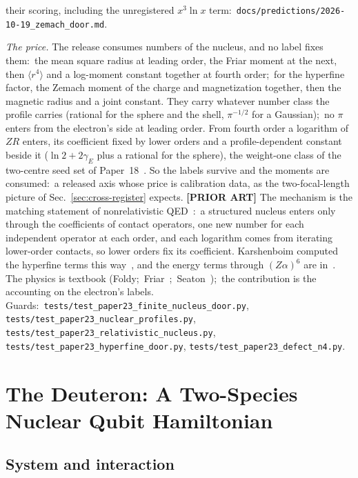 \documentclass[twocolumn,prc,amsmath,amssymb,superscriptaddress]{revtex4-2}
\begin{document}
their scoring, including the unregistered $x^3\ln x$ term:\ \texttt{docs/predictions/2026-10-19\_zemach\_door.md}.

\emph{The price.} The release consumes numbers of the nucleus, and no label fixes them:\ the mean square radius at leading order, the Friar moment at the next, then $\langle r^4\rangle$ and a log-moment constant together at fourth order;\ for the hyperfine factor, the Zemach moment of the charge and magnetization together, then the magnetic radius and a joint constant. They carry whatever number class the profile carries (rational for the sphere and the shell, $\pi^{-1/2}$ for a Gaussian);\ no $\pi$ enters from the electron's side at leading order. From fourth order a logarithm of $ZR$ enters, its coefficient fixed by lower orders and a profile-dependent constant beside it ($\ln 2 + 2\gamma_E$ plus a rational for the sphere), the weight-one class of the two-centre seed set of Paper~18~\cite{Paper18}. So the labels survive and the moments are consumed:\ a released axis whose price is calibration data, as the two-focal-length picture of Sec.~\ref{sec:cross-register} expects. \textbf{[PRIOR ART]} The mechanism is the matching statement of nonrelativistic QED~\cite{HillPaz2011}:\ a structured nucleus enters only through the coefficients of contact operators, one new number for each independent operator at each order, and each logarithm comes from iterating lower-order contacts, so lower orders fix its coefficient. Karshenboim computed the hyperfine terms this way~\cite{Karshenboim1997,Karshenboim2001}, and the energy terms through $(Z\alpha)^6$ are in~\cite{PPY2025}. The physics is textbook (Foldy;\ Friar~\cite{Friar1979};\ Seaton~\cite{Seaton1983});\ the contribution is the accounting on the electron's labels. Guards:\ \texttt{tests/test\_paper23\_finite\_nucleus\_door.py}, \texttt{tests/test\_paper23\_nuclear\_profiles.py}, \texttt{tests/test\_paper23\_relativistic\_nucleus.py}, \texttt{tests/test\_paper23\_hyperfine\_door.py}, \texttt{tests/test\_paper23\_defect\_n4.py}.

\section{The Deuteron: A Two-Species Nuclear Qubit Hamiltonian}
\label{sec:deuteron}

\subsection{System and interaction}
\end{document}

